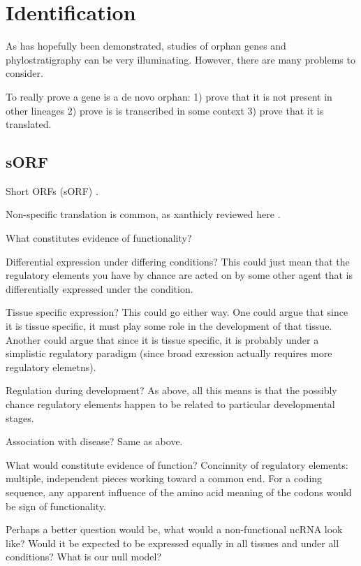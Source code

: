 \section{Identification}

    As has hopefully been demonstrated, studies of orphan genes and
    phylostratigraphy can be very illuminating. However, there are many
    problems to consider.

    To really prove a gene is a de novo orphan: 1) prove that it is not present
    in other lineages 2) prove is is transcribed in some context 3) prove that
    it is translated.

\subsection{sORF}

  Short ORFs (sORF) \cite{kageyama_coding_2011}.

  Non-specific translation is common, as xanthicly reviewed here \cite{wilusz_long_2009}.  

  What constitutes evidence of functionality?

  Differential expression under differing conditions? This could just mean that
  the regulatory elements you have by chance are acted on by some other agent
  that is differentially expressed under the condition.

  Tissue specific expression? This could go either way. One could argue that
  since it is tissue specific, it must play some role in the development of that
  tissue. Another could argue that since it is tissue specific, it is probably
  under a simplistic regulatory paradigm (since broad exression actually requires
  more regulatory elemetns).

  Regulation during development? As above, all this means is that the possibly
  chance regulatory elements happen to be related to particular developmental
  stages.

  Association with disease? Same as above.

  What would constitute evidence of function? Concinnity of regulatory elements:
  multiple, independent pieces working toward a common end. For a coding
  sequence, any apparent influence of the amino acid meaning of the codons would
  be sign of functionality.

  Perhaps a better question would be, what would a non-functional ncRNA look
  like? Would it be expected to be expressed equally in all tissues and under all
  conditions? What is our null model?

